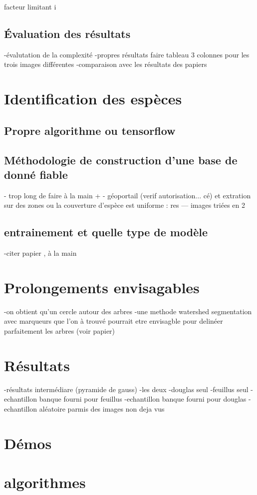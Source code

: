\documentclass{article}
\begin{document}
		facteur limitant i

	\subsection{\'{E}valuation des résultats}
		-évalutation de la complexité 
		-propres résultats
		faire tableau 3 colonnes pour les trois images différentes
		-comparaison avec les résultats des papiers 

\section{Identification des espèces}
	
	\subsection{Propre algorithme ou tensorflow}
	
	\subsection{Méthodologie de construction d'une base de donné fiable}
		- trop long de faire à la main + 
		- géoportail (verif autorisation... cé) et extration sur des zones ou la couverture d'espèce est uniforme : res --- images triées en 2
	
	\subsection{entrainement et quelle type de modèle }
		-citer papier , à la main 

\section{Prolongements envisagables}
	-on obtient qu'un cercle autour des arbres
	-une methode watershed segmentation avec marqueurs que l'on à trouvé pourrait etre envisagble pour delinéer parfaitement les arbres (voir papier) 

\nocite{NatesanResNet} %



\begin{appendix}
	\section{Résultats}	
		-résultats intermédiare (pyramide de gauss)
		-les deux 
		-douglas seul 
		-feuillus seul
		-echantillon banque fourni pour feuillus
		-echantillon banque fourni pour douglas 
		-echantillon aléatoire parmis des images non deja vus

	\section{Démos}
		
	\section{algorithmes}
\end{appendix}
\end{document}
